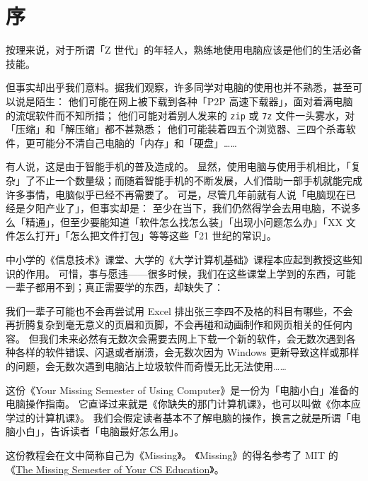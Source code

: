 \chapter{序}
\label{premble}

按理来说，对于所谓「Z 世代」的年轻人，熟练地使用电脑应该是他们的生活必备技能。

但事实却出乎我们意料。据我们观察，许多同学对电脑的使用也并不熟悉，甚至可以说是陌生：
他们可能在网上被下载到各种「P2P 高速下载器」，面对着满电脑的流氓软件而不知所措；
他们可能对着别人发来的 \texttt{zip} 或 \texttt{7z} 文件一头雾水，对「压缩」和「解压缩」都不甚熟悉；
他们可能装着四五个浏览器、三四个杀毒软件，更可能分不清自己电脑的「内存」和「硬盘」……

有人说，这是由于智能手机的普及造成的。
显然，使用电脑与使用手机相比，「复杂」了不止一个数量级；而随着智能手机的不断发展，人们借助一部手机就能完成许多事情，电脑似乎已经不再需要了。
可是，尽管几年前就有人说「电脑现在已经是夕阳产业了」，但事实却是：
至少在当下，我们仍然得学会去用电脑，不说多么「精通」，但至少要能知道「软件怎么找怎么装」「出现小问题怎么办」「XX 文件怎么打开」「怎么把文件打包」等等这些「21 世纪的常识」。

中小学的《信息技术》课堂、大学的《大学计算机基础》课程本应起到教授这些知识的作用。
可惜，事与愿违——很多时候，我们在这些课堂上学到的东西，可能一辈子都用不到；真正需要学的东西，却缺失了：

我们一辈子可能也不会再尝试用 Excel 排出张三李四不及格的科目有哪些，不会再折腾复杂到毫无意义的页眉和页脚，不会再碰和动画制作和网页相关的任何内容。
但我们未来必然有无数次会需要去网上下载一个新的软件，会无数次遇到各种各样的软件错误、闪退或者崩溃，会无数次因为 Windows 更新导致这样或那样的问题，会无数次遇到电脑沾上垃圾软件而奇慢无比无法使用……

这份《Your Missing Semester of Using Computer》是一份为「电脑小白」准备的电脑操作指南。
它直译过来就是《你缺失的那门计算机课》，也可以叫做《你本应学过的计算机课》。
我们会假定读者基本不了解电脑的操作，换言之就是所谓「电脑小白」，告诉读者「电脑最好怎么用」。

这份教程会在文中简称自己为《Missing》。
《Missing》的得名参考了 MIT 的《\href{https://missing.csail.mit.edu/}{The Missing Semester of Your CS Education}》。